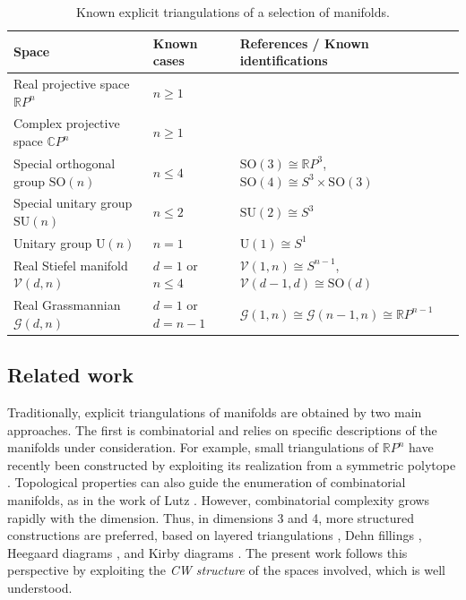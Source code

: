 \documentclass[a4paper,english,cleveref,autoref,thm-restate,nolineno]{socg-lipics-v2021}
\newcommand{\C}{\mathbb C}
\newcommand{\R}{\mathbb R}
\newcommand{\GG}{\mathcal G} %
\newcommand{\VV}{\mathcal V} %
\begin{document}
\begin{table}[!htbp]
	\centering
	\begin{tabular}{lll}
		\hline
		\textbf{Space}                    
		& \textbf{Known cases}
		& \textbf{References / Known identifications} \\
		\hline
		Real projective space $\R P^n$                          
		& $n \geq 1$
		& \cite{vonKuhnel1987Kummer,balagopalan2017vertex,adiprasito2022subexponential} 
		\\
		Complex projective space $\C P^n$                          
		& $n \geq 1$
		& \cite{kuhnel19839,sergeraert2010triangulations,bagchi2011icosahedron,bagchi2012triangulation,Sarkar2014CPn,datta2025simplicial} \\
		Special orthogonal group $\mathrm{SO}(n)$                  
		& $n \leq 4$
		& $\mathrm{SO}(3)\cong\R P^3$, $\mathrm{SO}(4)\cong S^3\times\mathrm{SO}(3)$                              
		\\
		Special unitary group $\mathrm{SU}(n)$                  
		& $n\leq 2$
		& $\mathrm{SU}(2)\cong S^3$ 
		\\
		Unitary group $\mathrm{U}(n)$                   
		& $n=1$
		& $\mathrm{U}(1)\cong S^1$ 
		\\
		Real Stiefel manifold $\VV(d,n)$             
		& $d = 1$ or $n \leq 4$
		& 
		$\VV(1,n)\cong S^{n-1}$, 
		$\VV(d-1,d)\cong \mathrm{SO}(d)$ 
		\\
		Real Grassmannian $\GG(d,n)$             
		& $d = 1$ or $d = n-1$
		& $\GG(1,n)\cong \GG(n-1,n) \cong \R P^{n-1}$                                            
		\\
		\hline
	\end{tabular}
	\caption{
		Known explicit triangulations of a selection of manifolds.
		}
	\label{tab:known_triangulations}
\end{table}

\subsection{Related work}

Traditionally, explicit triangulations of manifolds are obtained by two main approaches.
The first is combinatorial and relies on specific descriptions of the manifolds under consideration.
For example, small triangulations of $\R P^n$ have recently been constructed by exploiting its realization from a symmetric polytope \cite{adiprasito2022subexponential}.
Topological properties can also guide the enumeration of combinatorial manifolds, as in the work of Lutz \cite{MR2410566,MR2552676}.
However, combinatorial complexity grows rapidly with the dimension.
Thus, in dimensions 3 and 4, more structured constructions are preferred, based on layered triangulations \cite{jaco2006layeredtriangulations3manifolds,jaco2009minimal,jaco2011coverings}, Dehn fillings \cite{DunfieldExceptionalDehnFillings}, Heegaard diagrams \cite{ennes_et_al:LIPIcs.ESA.2025.37,He_Morgan_Thompson_2025,ennes2025compresseddatastructuresheegaard}, and Kirby diagrams \cite{Burke_2025,burke_et_al:LIPIcs.SoCG.2025.28}.
The present work follows this perspective by exploiting the \textit{CW structure} of the spaces involved, which is well understood.
\end{document}
